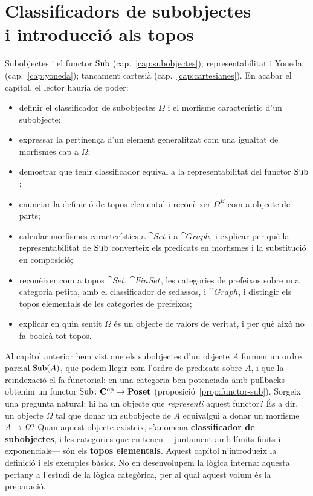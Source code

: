\chapter[Classificadors de subobjectes i topos]{\texorpdfstring{Classificadors de subobjectes\\ i introducció als topos}{Classificadors de subobjectes i introducció als topos}}
\label{cap:topos}

\begin{objectius}
 Subobjectes i el functor $\operatorname{Sub}$ (cap.~\ref{cap:subobjectes}); representabilitat i Yoneda (cap.~\ref{cap:yoneda}); tancament cartesià (cap.~\ref{cap:cartesianes}).
 En acabar el capítol, el lector hauria de poder:
\begin{itemize}
  \item definir el classificador de subobjectes $\Omega$ i el morfisme característic d'un subobjecte;
  \item expressar la pertinença d'un element generalitzat com una igualtat de morfismes cap a $\Omega$;
  \item demostrar que tenir classificador equival a la representabilitat del functor $\operatorname{Sub}$;
  \item enunciar la definició de topos elemental i reconèixer $\Omega^{E}$ com a objecte de parts;
  \item calcular morfismes característics a $\cat{Set}$ i a $\cat{Graph}$, i explicar per què la representabilitat de $\operatorname{Sub}$ converteix els predicats en morfismes i la substitució en composició;
  \item reconèixer com a topos $\cat{Set}$, $\cat{FinSet}$, les categories de prefeixos sobre una categoria petita, amb el classificador de sedassos, i $\cat{Graph}$, i distingir els topos elementals de les categories de prefeixos;
  \item explicar en quin sentit $\Omega$ és un objecte de valors de veritat, i per què això no fa booleà tot topos.
\end{itemize}
\end{objectius}

Al capítol anterior hem vist que els subobjectes d'un objecte $A$ formen un ordre parcial $\operatorname{Sub}(A)$, que podem llegir com l'ordre de predicats sobre $A$, i que la reindexació el fa functorial: en una categoria ben potenciada amb pullbacks obtenim un functor $\operatorname{Sub}\colon\mathbf{C}^{\mathrm{op}}\to\mathbf{Poset}$ (proposició~\ref{prop:functor-sub}). Sorgeix una pregunta natural: hi ha un objecte que \emph{representi} aquest functor? És a dir, un objecte $\Omega$ tal que donar un subobjecte de $A$ equivalgui a donar un morfisme $A\to\Omega$? Quan aquest objecte existeix, s'anomena \textbf{classificador de subobjectes}, i les categories que en tenen ---juntament amb límits finits i exponencials--- són els \textbf{topos elementals}. Aquest capítol n'introdueix la definició i els exemples bàsics. No en desenvolupem la lògica interna: aquesta pertany a l'estudi de la lògica categòrica, per al qual aquest volum és la preparació.

